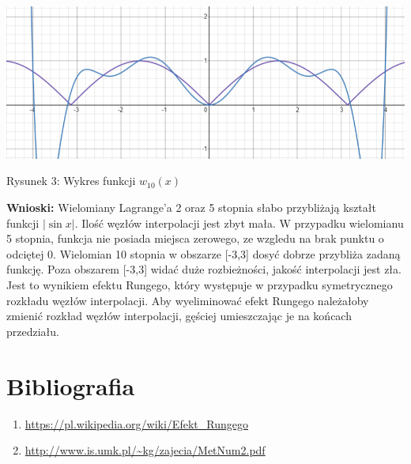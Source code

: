 \documentclass[5]{article}
\begin{document}
\hfil
\includegraphics[scale=0.5]{wielomian10.PNG} \par
\vspace{3mm}
\hfil{Rysunek 3: Wykres funkcji $w_{10}(x)$} \par

\vspace{5mm}

\textbf{Wnioski:} \newline  
Wielomiany Lagrange'a 2 oraz 5 stopnia słabo przybliżają kształt funkcji $\left | \sin x \right |$. Ilość węzłów interpolacji jest zbyt mała. W przypadku wielomianu 5 stopnia, funkcja nie posiada miejsca zerowego, ze wzgledu na brak punktu o odciętej 0.\newline
Wielomian 10 stopnia w obszarze [-3,3] dosyć dobrze przybliża zadaną funkcję. Poza obszarem [-3,3] widać duże rozbieżności, jakość interpolacji jest zła. Jest to wynikiem efektu Rungego, który występuje w przypadku symetrycznego rozkładu węzłów interpolacji. Aby wyeliminować efekt Rungego należałoby zmienić rozkład węzłów interpolacji, gęściej umieszczając je na końcach przedziału.

\section{Bibliografia}

\begin{enumerate}
  \item \url{https://pl.wikipedia.org/wiki/Efekt_Rungego}
  \item \url{http://www.is.umk.pl/~kg/zajecia/MetNum2.pdf}
\end{enumerate}
\end{document}

